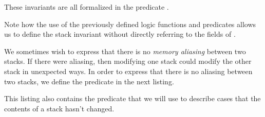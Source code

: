 These invariants are all formalized in the predicate .

Note how the use of the previously defined logic functions and predicates
allows us to define the stack invariant without
directly referring to the fields of \stacktype.

We sometimes wish to express that there is no \emph{memory aliasing} between two stacks.
If there were aliasing, then modifying one stack could modify the other
stack in unexpected ways.
In order to express that there is no aliasing between two stacks,
we define the predicate \StackSeparated in the next listing.



This listing also contains the predicate 
that we will use to describe cases that the contents of a stack hasn't changed.

